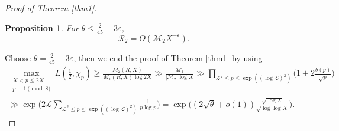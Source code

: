 \documentclass[12pt,reqno]{amsart}
\numberwithin{equation}{section}
\theoremstyle{plain}
\newtheorem{proposition}[theorem]{Proposition}
\theoremstyle{definition}
\theoremstyle{remark}
\begin{document}
\begin{proof}[Proof of Theorem \ref{thm1}]
\begin{proposition}\label{prop:R2}
For $\theta\leq \frac{2}{45}-3\varepsilon$,
\begin{equation*}
  \mathcal{R}_2=O(\mathcal{M}_2X^{-\varepsilon}).
  \end{equation*}
\end{proposition}

Choose $\theta= \frac{2}{45}-3\varepsilon$,
then we end the proof of Theorem \ref{thm1} by using
\begin{multline*}
  \max_{\substack{X< p\leq 2X\\p\equiv 1\pmod 8}}
  L(\frac{1}{2},\chi_p)\geq
\frac{M_2(R,X)}{ M_1(R,X)\log 2X}
\gg
\frac{\mathcal{M}_1}{|\mathcal{M}_2|\log X}
  \gg \prod_{\mathcal{L}^2\leq p \leq \exp((\log \mathcal{L})^2)}
  \bigg(1+2\frac{b(p)}{\sqrt{p}}\bigg)
 \\ \gg \exp\bigg(2\mathcal{L} \sum_{\mathcal{L}^2\leq p \leq \exp((\log \mathcal{L})^2)} \frac{1}{p\log p}\bigg)
 =\exp\Big((2\sqrt{\theta}+o(1))\frac{\sqrt{\log X}}{\sqrt{\log\log X}}\Big).
\end{multline*}
\end{proof}
\end{document}

